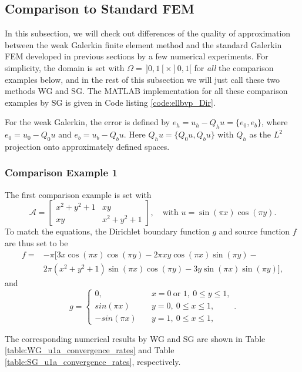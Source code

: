	\subsection{Comparison to Standard FEM}\label{subsection.6.4}
	In this subsection, we will check out differences of the  quality 
	of approximation between the weak Galerkin finite element method and the 
	standard Galerkin FEM developed in previous sections by a few numerical
	experiments. For simplicity, the domain is set with
	$\Omega=\,]0,1[ \times ]0,1[$ for \emph{all} the comparison examples below, 
	and	in the rest of this subsection we will just call these two methods WG 
	and	SG.	The MATLAB implementation for all these comparison examples by 
	SG is given in Code listing \ref{code:ellbvp_Dir}.
	
	For the weak Galerkin, the error is defined by $e_h=u_h-Q_h u=\{e_0,e_b\}$,
	where $e_0=u_0-Q_0 u$ and $e_b=u_b-Q_b u$. Here $Q_hu=\{Q_0 u, Q_b u\}$
	with $Q_h$ as the $L^2$ projection onto approximately defined spaces.
	
	\subsubsection*{Comparison Example 1}
	The first comparison example is set with
	\[\mathcal{A}=\begin{bmatrix}
		x^2+y^2+1 & xy \\
		xy	& x^2+y^2+1
	\end{bmatrix},\quad \textrm{with } u=\sin(\pi x)\cos(\pi y).\]
	To match the equations, the Dirichlet boundary function $g$ and source 
	function $f$ are thus set to be
	\[\begin{split}
		f=&-\pi[ 3x\cos(\pi x)\cos(\pi y)-2\pi xy\cos(\pi x)\sin(\pi y)-\\
		&2\pi(x^2+y^2+1)\sin(\pi x)\cos(\pi y)-3y\sin(\pi x)\sin(\pi y) ], 
	\end{split}\]
	and 
	\begin{equation}\label{eq:Comp Ex1 g}
		g=\begin{cases}
			0,&\quad x=0\ \textrm{or }1,\ 0\leq y \leq 1,\\
			sin(\pi x) &\quad y=0,\ 0\leq x \leq 1,\\
			-sin(\pi x) &\quad y=1,\ 0\leq x \leq 1,
		\end{cases}.
	\end{equation}

	The corresponding numerical results by WG and SG are shown in 
	Table \ref{table:WG_u1a_convergence_rates} and 
	Table \ref{table:SG_u1a_convergence_rates}, respectively.
	
